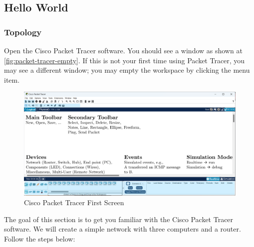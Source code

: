 \subsection{Hello World}

\subsubsection{Topology}

Open the Cisco Packet Tracer software. You should see a window as shown at
\autoref{fig:packet-tracer-empty}. If this is not your first time using Packet
Tracer, you may see a different window; you may empty the workspace by clicking
the  menu item.

\begin{figure}
    \centering
    \includegraphics[width=\textwidth]{images/packet-tracer-empty.pdf}
    \caption{Cisco Packet Tracer First Screen}\label{fig:packet-tracer-empty}
\end{figure}

The goal of this section is to get you familiar with the Cisco Packet Tracer
software. We will create a simple network with three computers and a router.
Follow the steps below:

